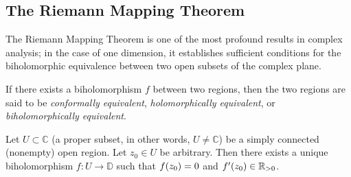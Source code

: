 \subsection{The Riemann Mapping Theorem}
The Riemann Mapping Theorem is one of the most profound results in complex analysis; in the case of one dimension, it establishes sufficient conditions for the biholomorphic equivalence between two open subsets of the complex plane.

If there exists a biholomorphism \(f\) between two regions, then the two regions are said to be \textit{conformally equivalent}, \textit{holomorphically equivalent}, or \textit{biholomorphically equivalent}.
\begin{theorem}\label{thm:riemannmapping}
    Let \(U\subset\mathbb{C}\) (a proper subset, in other words, \(U\neq\mathbb{C}\)) be a simply connected (nonempty) open region. Let \(z_0\in U\) be arbitrary. Then there exists a unique biholomorphism \(f:U\to\mathbb{D}\) such that \(f\qty(z_0)=0\) and \(f'\qty(z_0)\in\mathbb{R}_{>0}\).
\end{theorem}

